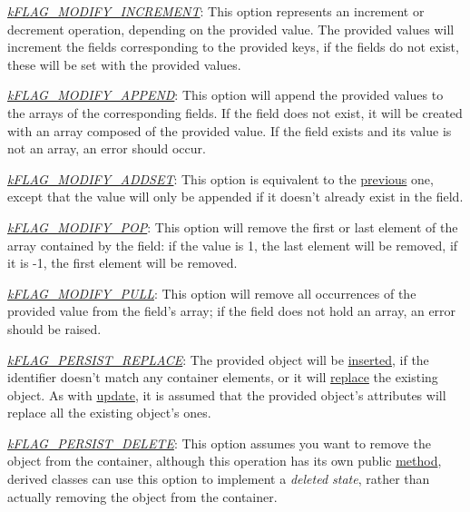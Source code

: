 \begin{DoxyItemize}
\begin{DoxyItemize}
\begin{DoxyItemize}
\item {\itshape \hyperlink{}{k\-F\-L\-A\-G\-\_\-\-M\-O\-D\-I\-F\-Y\-\_\-\-I\-N\-C\-R\-E\-M\-E\-N\-T}}\-: This option represents an increment or decrement operation, depending on the provided value. The provided values will increment the fields corresponding to the provided keys, if the fields do not exist, these will be set with the provided values. 
\item {\itshape \hyperlink{}{k\-F\-L\-A\-G\-\_\-\-M\-O\-D\-I\-F\-Y\-\_\-\-A\-P\-P\-E\-N\-D}}\-: This option will append the provided values to the arrays of the corresponding fields. If the field does not exist, it will be created with an array composed of the provided value. If the field exists and its value is not an array, an error should occur. 
\item {\itshape \hyperlink{}{k\-F\-L\-A\-G\-\_\-\-M\-O\-D\-I\-F\-Y\-\_\-\-A\-D\-D\-S\-E\-T}}\-: This option is equivalent to the \hyperlink{}{previous} one, except that the value will only be appended if it doesn't already exist in the field. 
\item {\itshape \hyperlink{}{k\-F\-L\-A\-G\-\_\-\-M\-O\-D\-I\-F\-Y\-\_\-\-P\-O\-P}}\-: This option will remove the first or last element of the array contained by the field\-: if the value is 1, the last element will be removed, if it is -\/1, the first element will be removed. 
\item {\itshape \hyperlink{}{k\-F\-L\-A\-G\-\_\-\-M\-O\-D\-I\-F\-Y\-\_\-\-P\-U\-L\-L}}\-: This option will remove all occurrences of the provided value from the field's array; if the field does not hold an array, an error should be raised. 
\end{DoxyItemize}
\item {\itshape \hyperlink{}{k\-F\-L\-A\-G\-\_\-\-P\-E\-R\-S\-I\-S\-T\-\_\-\-R\-E\-P\-L\-A\-C\-E}}\-: The provided object will be \hyperlink{}{inserted}, if the identifier doesn't match any container elements, or it will \hyperlink{}{replace} the existing object. As with \hyperlink{}{update}, it is assumed that the provided object's attributes will replace all the existing object's ones. 
\item {\itshape \hyperlink{}{k\-F\-L\-A\-G\-\_\-\-P\-E\-R\-S\-I\-S\-T\-\_\-\-D\-E\-L\-E\-T\-E}}\-: This option assumes you want to remove the object from the container, although this operation has its own public \hyperlink{class_c_container_aa91ec2f4624a2ebfb74668f274139329}{method}, derived classes can use this option to implement a {\itshape deleted state}, rather than actually removing the object from the container. 

\end{DoxyItemize}
\end{DoxyItemize}
